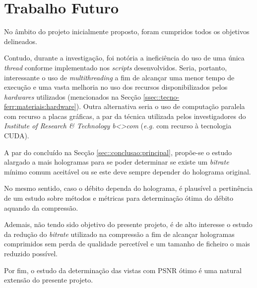


\section{Trabalho Futuro}
\label{sec::conclusao:futuro}


No âmbito do projeto inicialmente proposto, foram cumpridos todos os objetivos delineados.

Contudo, durante a investigação, foi notória a ineficiência do uso de uma única \textit{thread} conforme implementado nos \textit{scripts} desenvolvidos. Seria, portanto, interessante o uso de \textit{multithreading} a fim de alcançar uma menor tempo de execução e uma vasta melhoria no uso dos recursos disponibilizados pelos \textit{hardwares} utilizados (mencionados na Secção \ref{ssec::tecno-ferr:materiais:hardware}). Outra alternativa seria o uso de computação paralela com recurso a placas gráficas, a par da técnica utilizada pelos investigadores do \textit{Institute of Research \& Technology b<>com} (\textit{e.g.} com recurso à tecnologia \ac{CUDA}).


A par do concluído na Secção \ref{sec::conclusao:principal}, propõe-se o estudo alargado a mais hologramas para se poder determinar se existe um \textit{bitrate} mínimo comum  aceitável ou se este deve sempre depender do holograma original.

No mesmo sentido, caso o débito dependa do holograma, é plausível a pertinência de um estudo sobre métodos e métricas para determinação ótima do débito aquando da compressão.

Ademais, não tendo sido objetivo do presente projeto, é de alto interesse o estudo da redução do \textit{bitrate} utilizado na compressão a fim de alcançar hologramas comprimidos sem perda de qualidade percetível e um tamanho de ficheiro o mais reduzido possível.

Por fim, o estudo da determinação das vistas com \ac{PSNR} ótimo é uma natural extensão do presente projeto.


